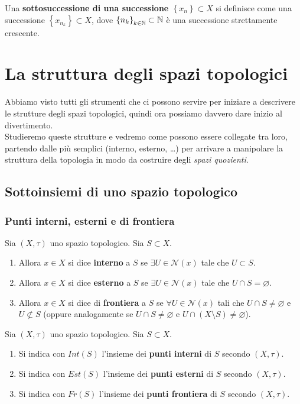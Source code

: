 \begin{definition}
	Una \textbf{sottosuccessione di una successione $\left\{x_n\right\} \subset X$} si definisce come una successione $\left\{x_{n_k}\right\} \subset X$, dove $\left\{n_k\right\}_{k\in \mathbb{N}} \subset \mathbb{N}$ è una successione strettamente crescente. 
\end{definition}




\chapter{La struttura degli spazi topologici}
Abbiamo visto tutti gli strumenti che ci possono servire per iniziare a descrivere le strutture degli spazi topologici, quindi ora possiamo davvero dare inizio al divertimento. \\ Studieremo queste strutture e vedremo come possono essere collegate tra loro, partendo dalle più semplici (interno, esterno, \dots) per arrivare a manipolare la struttura della topologia in modo da costruire degli \textit{spazi quozienti}.  
\newpage
\section{Sottoinsiemi di uno spazio topologico}
\subsection{\textcolor{TopGener}{\textbf{Punti interni, esterni e di frontiera}}}



\begin{definition}
	Sia $(X, \tau)$ uno spazio topologico. Sia $S \subset X$. 
	\begin{enumerate}
		\item Allora $x \in X$ si dice \textbf{interno} a $S$ se $\exists U \in \mathcal{N}(x)$ tale che $U \subset S$.
		\item Allora $x \in X$ si dice \textbf{esterno} a $S$ se $\exists U \in \mathcal{N}(x)$ tale che $U \cap S = \varnothing$.
		\item Allora $x \in X$ si dice di \textbf{frontiera} a $S$ se $\forall U \in \mathcal{N}(x)$ tali che $U \cap S \neq \varnothing$ e $U \not\subset S$ (oppure analogamente se $U \cap S \neq \varnothing$ e $U \cap (X \setminus S) \neq \varnothing$).
	\end{enumerate}
\end{definition}

\begin{definition}
	Sia $(X, \tau)$ uno spazio topologico. Sia $S \subset X$. 
	\begin{enumerate}
		\item Si indica con $Int(S)$ l'insieme dei \textbf{punti interni} di $S$ secondo $(X,\tau)$.
		\item Si indica con $Est(S)$ l'insieme dei \textbf{punti esterni} di $S$ secondo $(X,\tau)$.
		\item Si indica con $Fr(S)$ l'insieme dei \textbf{punti frontiera} di $S$ secondo $(X,\tau)$.
	\end{enumerate}
\end{definition}	

